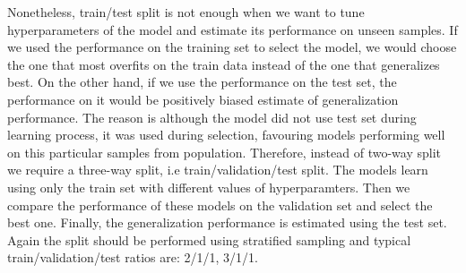\documentclass[12pt, wide]{mwart}
\begin{document}
Nonetheless, train/test split is not enough when we want to tune hyperparameters of the model and estimate its performance on unseen samples. If we used the performance on the training set to select the model, we would choose the one that most overfits on the train data instead of the one that generalizes best. On the other hand, if we use the performance on the test set, the performance on it would be positively biased estimate of generalization performance. The reason is although the model did not use test set during learning process, it was used during selection, favouring models performing well on this particular samples from population. Therefore, instead of two-way split we require a three-way split, i.e train/validation/test split. The models learn using only the train set with different values of hyperparamters. Then we compare the performance of these models on the validation set and select the best one. Finally, the generalization performance is estimated using the test set. Again the split should be performed using stratified sampling and typical train/validation/test ratios are: 2/1/1, 3/1/1.
\end{document}
